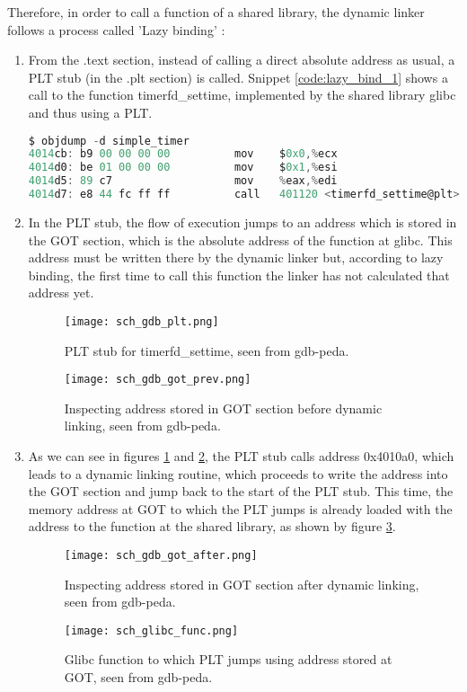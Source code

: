 Therefore, in order to call a function of a shared library, the dynamic linker follows a process called 'Lazy binding' \cite{plt_got_technovelty}:
\begin{enumerate}
\item From the .text section, instead of calling a direct absolute address as usual, a PLT stub (in the .plt section) is called. Snippet \ref{code:lazy_bind_1} shows a call to the function timerfd\_settime, implemented by the shared library glibc and thus using a PLT.
\begin{lstlisting}[language=C, caption={Call to PLT stub seen from objdump.}, label={code:lazy_bind_1}]
$ objdump -d simple_timer
4014cb:	b9 00 00 00 00       	mov    $0x0,%ecx
4014d0:	be 01 00 00 00       	mov    $0x1,%esi
4014d5:	89 c7                	mov    %eax,%edi
4014d7:	e8 44 fc ff ff       	call   401120 <timerfd_settime@plt>
\end{lstlisting}

\item In the PLT stub, the flow of execution jumps to an address which is stored in the GOT section, which is the absolute address of the function at glibc. This address must be written there by the dynamic linker but, according to lazy binding, the first time to call this function the linker has not calculated that address yet. 

\begin{figure}[htbp]
	\centering
	\texttt{[image: sch\_gdb\_plt.png]}
	\caption{PLT stub for timerfd\_settime, seen from gdb-peda.}
	\label{fig:lazy_bind_2}
\end{figure}

\begin{figure}[htbp]
	\centering
	\texttt{[image: sch\_gdb\_got\_prev.png]}
	\caption{Inspecting address stored in GOT section before dynamic linking, seen from gdb-peda.}
	\label{fig:lazy_bind_3}
\end{figure}

\item As we can see in figures \ref{fig:lazy_bind_2} and \ref{fig:lazy_bind_3}, the PLT stub calls address 0x4010a0, which leads to a dynamic linking routine, which proceeds to write the address into the GOT section and jump back to the start of the PLT stub. This time, the memory address at GOT to which the PLT jumps is already loaded with the address to the function at the shared library, as shown by figure \ref{fig:lazy_bind_4}.

\begin{figure}[htbp]
	\centering
	\texttt{[image: sch\_gdb\_got\_after.png]}
	\caption{Inspecting address stored in GOT section after dynamic linking, seen from gdb-peda.}
	\label{fig:lazy_bind_4}
\end{figure}

\begin{figure}[htbp]
	\centering
	\texttt{[image: sch\_glibc\_func.png]}
	\caption{Glibc function to which PLT jumps using address stored at GOT, seen from gdb-peda.}
	\label{fig:lazy_bind_5}
\end{figure}

\end{enumerate}

